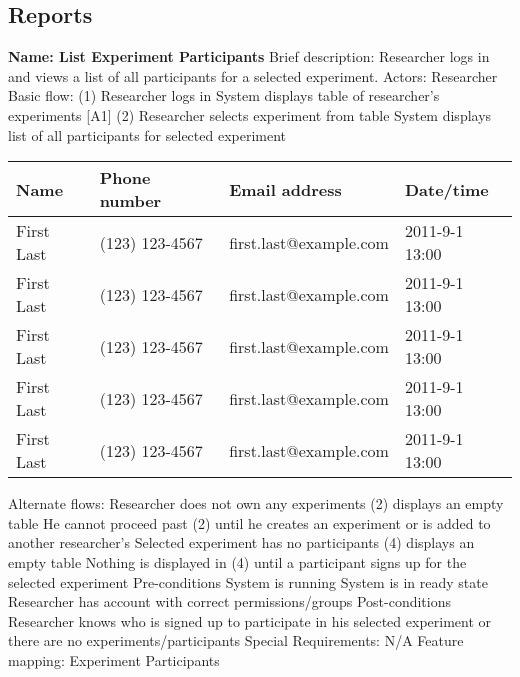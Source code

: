 \subsection{Reports}
\begin{outline}[enumerate]

\1 {\bf Name: List Experiment Participants}
\2 Brief description: Researcher logs in and views a list of all participants for a selected experiment.
\2 Actors: Researcher
\2 Basic flow:
\3 (1) Researcher logs in
\3 System displays table of researcher's experiments [A1]
\3 (2) Researcher selects experiment from table
\3 System displays list of all participants for selected experiment
        \begin{table}
            \begin{tabular}{|l|l|l|l|}
                \hline
                Name       & Phone number   & Email address          & Date/time      \\ \hline
                First Last & (123) 123-4567 & first.last@example.com & 2011-9-1 13:00 \\
                First Last & (123) 123-4567 & first.last@example.com & 2011-9-1 13:00 \\
                First Last & (123) 123-4567 & first.last@example.com & 2011-9-1 13:00 \\
                First Last & (123) 123-4567 & first.last@example.com & 2011-9-1 13:00 \\
                First Last & (123) 123-4567 & first.last@example.com & 2011-9-1 13:00 \\
                \hline
            \end{tabular}
        \end{table}
\2 Alternate flows:
\3 [A1] Researcher does not own any experiments
\4 (2) displays an empty table
\4 He cannot proceed past (2) until he creates an experiment or is added to another researcher's
\3 Selected experiment has no participants
\4 (4) displays an empty table
\4 Nothing is displayed in (4) until a participant signs up for the selected experiment
\2 Pre-conditions
\3 System is running
\3 System is in ready state
\3 Researcher has account with correct permissions/groups
\2 Post-conditions
\3 Researcher knows who is signed up to participate in his selected experiment or there are no experiments/participants
\2 Special Requirements:
\3 N/A
\2 Feature mapping:
\3 Experiment Participants


\end{outline}
